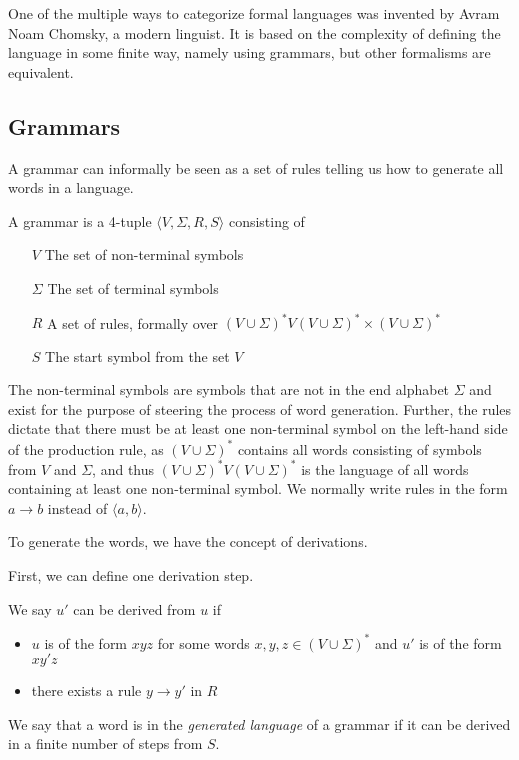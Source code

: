One of the multiple ways to categorize formal languages was invented by Avram Noam Chomsky, a modern linguist.
It is based on the complexity of defining the language in some finite way, namely using grammars, but other formalisms are equivalent.

\subsection{Grammars}\label{subsec:grammars}

A grammar can informally be seen as a set of rules telling us how to generate all words in a language.

\begin{define}[Grammar]
    A grammar is a 4-tuple $\langle V, \Sigma, R, S \rangle$ consisting of
    \begin{itemize}
        \item[$V$] The set of non-terminal symbols
        \item[$\Sigma$] The set of terminal symbols
        \item[$R$] A set of rules, formally over $(V \cup \Sigma)^{*}V(V \cup \Sigma)^{*} \times (V \cup \Sigma)^{*}$
        \item[$S$] The start symbol from the set $V$
    \end{itemize}
\end{define}

The non-terminal symbols are symbols that are not in the end alphabet $\Sigma$ and exist for the purpose of steering the process of word generation.
Further, the rules dictate that there must be at least one non-terminal symbol on the left-hand side of the production rule, as $(V \cup \Sigma)^*$ contains all words consisting of symbols from $V$ and $\Sigma$, and thus $(V \cup \Sigma)^{*}V(V \cup \Sigma)^{*}$ is the language of all words containing at least one non-terminal symbol.
We normally write rules in the form $a \to b$ instead of $\langle a, b \rangle$.

To generate the words, we have the concept of derivations.
\begin{define}[Derivation]
    First, we can define one derivation step.

    We say $u'$ can be derived from $u$ if
    \begin{itemize}
        \setlength\itemsep{0.2em}
        \item $u$ is of the form $xyz$ for some words $x, y, z \in (V \cup \Sigma)^*$ and $u'$ is of the form $xy'z$
        \item there exists a rule $y \to y'$ in $R$
    \end{itemize}

    We say that a word is in the \emph{generated language} of a grammar if it can be derived in a finite number of steps from $S$.
\end{define}

